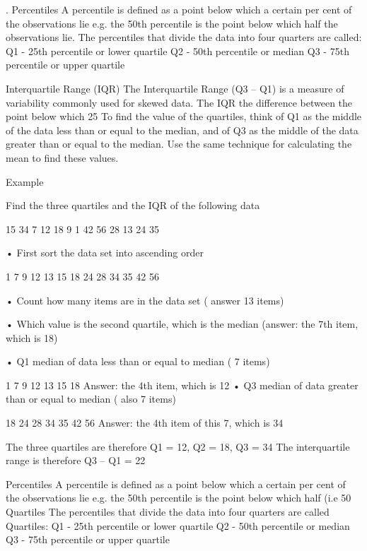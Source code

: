 
.   Percentiles
A percentile is defined as a point below which a certain per cent of the observations lie e.g. the 50th percentile is the point below which half the observations lie. The percentiles that divide the data into four quarters are called: 
Q1       - 25th percentile or lower quartile
Q2       - 50th percentile or median
Q3        - 75th percentile or upper quartile

Interquartile Range (IQR)
The Interquartile Range (Q3 – Q1) is a  measure of variability commonly used for skewed data.
The IQR  the difference between the point below which 25%
To find the value of the quartiles, think of Q1 as the middle of the data less than or equal to the median, and of Q3 as the middle of the data greater than or equal to the median.
Use the same technique for calculating the mean to find these values.






Example

Find the three quartiles and the IQR of the following data

 15  34  7  12  18  9  1  42  56  28  13  24  35

•	First sort the data set into ascending order

1 7  9 12 13 15 18  24 28 34 35 42 56

•	Count how many items are in the data set ( answer 13 items)

•	Which value is the second quartile, which is the median (answer: the 7th item, which is 18)

•	Q1  median of data less than or equal to median ( 7 items)

1	7  9 12 13 15 18 
 Answer: the 4th item, which is 12
•	Q3  median of data greater than or equal to median ( also 7 items)

18  24 28 34 35 42 56 
Answer: the 4th item of this 7, which is 34

The three quartiles are therefore Q1 = 12, Q2 = 18, Q3 = 34
The interquartile range is therefore Q3 – Q1 = 22

\newpage
Percentiles
A percentile is defined as a point below which a certain per cent of the observations lie e.g. the 50th percentile is the point below which half (i.e 50%
Quartiles
The percentiles that divide the data into four quarters are called Quartiles: 
Q1       - 25th percentile or lower quartile
Q2       - 50th percentile or median
Q3       - 75th percentile or upper quartile

